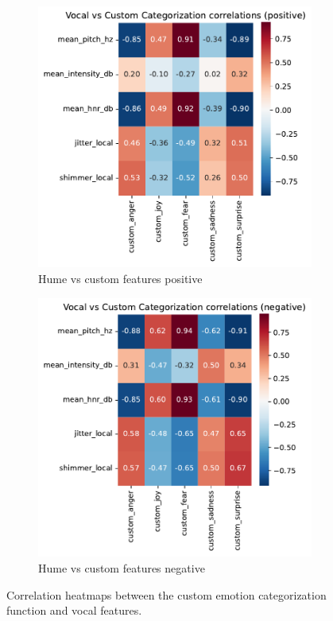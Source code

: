 \begin{figure}[H]
    \centering 
    \begin{subfigure}[b]{0.45\textwidth}
        \includegraphics[width=\textwidth]{png/results/rq1_new/vocal_vs_custom_categorization_correlations_positive.pdf}
        \caption{Hume vs custom features positive}
        \label{fig:custom_vocal_positive}
    \end{subfigure}
    \begin{subfigure}[b]{0.45\textwidth}
        \includegraphics[width=\textwidth]{png/results/rq1_new/vocal_vs_custom_categorization_correlations_negative.pdf}
        \caption{Hume vs custom features negative}        
        \label{fig:custom_vocal_negative}
    \end{subfigure} 
    \caption{Correlation heatmaps between the custom emotion categorization function and vocal features.}
    \label{fig:rq1_heatmaps_custom}       
\end{figure}
